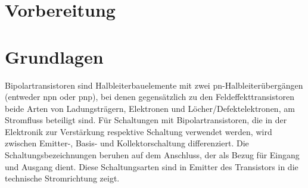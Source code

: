 \documentclass[12pt,english,ngerman]{scrartcl}
\begin{document}

\tableofcontents
\newpage




 

\section{Vorbereitung}\label{sec:Vorbereitung}
% 
% 


\section{Grundlagen}\label{sec:Grundlagen}

Bipolartransistoren sind Halbleiterbauelemente mit zwei pn-Halbleiterübergängen
(entweder npn oder pnp), bei denen gegensätzlich zu den Feldeffekttransistoren
beide Arten von Ladungsträgern, Elektronen und Löcher/Defektelektronen, am
Stromfluss beteiligt sind. Für Schaltungen mit Bipolartransistoren, die in der
Elektronik zur Verstärkung respektive Schaltung verwendet werden, wird zwischen
Emitter-, Basis- und Kollektorschaltung differenziert. Die
Schaltungsbezeichnungen beruhen auf dem Anschluss, der als Bezug für Eingang
und Ausgang dient. Diese Schaltungsarten sind in 
Emitter des Transistors in die technische Stromrichtung zeigt. 
\end{document}
